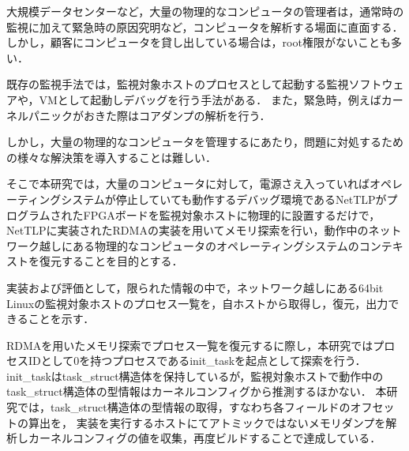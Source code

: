 \begin{jabstract}

大規模データセンターなど，大量の物理的なコンピュータの管理者は，通常時の監視に加えて緊急時の原因究明など，コンピュータを解析する場面に直面する．
しかし，顧客にコンピュータを貸し出している場合は，root権限がないことも多い．

既存の監視手法では，監視対象ホストのプロセスとして起動する監視ソフトウェアや，VMとして起動しデバッグを行う手法がある．
また，緊急時，例えばカーネルパニックがおきた際はコアダンプの解析を行う．

しかし，大量の物理的なコンピュータを管理するにあたり，問題に対処するための様々な解決策を導入することは難しい．

そこで本研究では，大量のコンピュータに対して，電源さえ入っていればオペレーティングシステムが停止していても動作するデバッグ環境であるNetTLPがプログラムされたFPGAボードを監視対象ホストに物理的に設置するだけで，
NetTLPに実装されたRDMAの実装を用いてメモリ探索を行い，動作中のネットワーク越しにある物理的なコンピュータのオペレーティングシステムのコンテキストを復元することを目的とする．

実装および評価として，限られた情報の中で，ネットワーク越しにある64bit Linuxの監視対象ホストのプロセス一覧を，自ホストから取得し，復元，出力できることを示す．

RDMAを用いたメモリ探索でプロセス一覧を復元するに際し，本研究ではプロセスIDとして0を持つプロセスであるinit\_taskを起点として探索を行う．
init\_taskはtask\_struct構造体を保持しているが，監視対象ホストで動作中のtask\_struct構造体の型情報はカーネルコンフィグから推測するほかない．
本研究では，task\_struct構造体の型情報の取得，すなわち各フィールドのオフセットの算出を，
実装を実行するホストにてアトミックではないメモリダンプを解析しカーネルコンフィグの値を収集，再度ビルドすることで達成している．

\end{jabstract}
